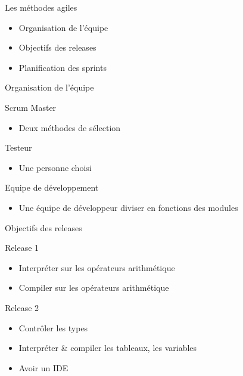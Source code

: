 \begin{chapter}{}{Les méthodes agiles}
    \begin{itemize}
          \item Organisation de l'équipe
          \item Objectifs des releases
          \item Planification des sprints
    \end{itemize}
\end{chapter}

\begin{frame}{Organisation de l'équipe}
    \begin{block}{Scrum Master}
        \begin{itemize}
            \item Deux méthodes de sélection
        \end{itemize}
    \end{block}
    \begin{block}{Testeur}
        \begin{itemize}
            \item Une personne choisi
        \end{itemize}
    \end{block}
    \begin{block}{Equipe de développement}
        \begin{itemize}
            \item Une équipe de développeur diviser en fonctions des modules
        \end{itemize}
    \end{block}
\end{frame}

\begin{frame}{Objectifs des releases}
    \begin{block}{Release 1}
        \begin{itemize}
            \item Interpréter sur les opérateurs arithmétique
            \item Compiler sur les opérateurs arithmétique
        \end{itemize}
    \end{block}

    \begin{block}{Release 2}
        \begin{itemize}
            \item Contrôler les types
            \item Interpréter \& compiler les tableaux, les variables
            \item Avoir un IDE
        \end{itemize}
    \end{block}
\end{frame}

